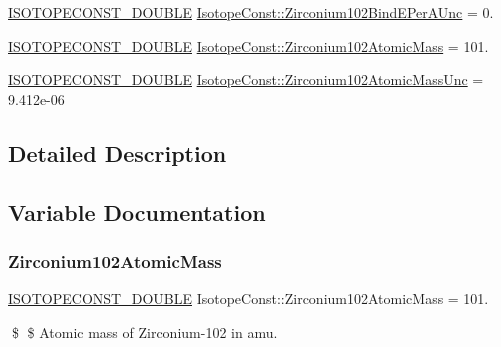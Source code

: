 \begin{DoxyCompactItemize}
\mbox{\hyperlink{group___isotope_const-_macros_ga8f45a7272ce02c0b4c65c44636ed719a}{I\+S\+O\+T\+O\+P\+E\+C\+O\+N\+S\+T\+\_\+\+D\+O\+U\+B\+LE}} \mbox{\hyperlink{group___isotope_const-_zirconium-_zr102_gaeffdb9b4c0a10ebe6998b044232ff07e}{Isotope\+Const\+::\+Zirconium102\+Bind\+E\+Per\+A\+Unc}} = 0.
\item 
\mbox{\hyperlink{group___isotope_const-_macros_ga8f45a7272ce02c0b4c65c44636ed719a}{I\+S\+O\+T\+O\+P\+E\+C\+O\+N\+S\+T\+\_\+\+D\+O\+U\+B\+LE}} \mbox{\hyperlink{group___isotope_const-_zirconium-_zr102_gacc2189c71642520ef259a0fdd64f6caa}{Isotope\+Const\+::\+Zirconium102\+Atomic\+Mass}} = 101.
\item 
\mbox{\hyperlink{group___isotope_const-_macros_ga8f45a7272ce02c0b4c65c44636ed719a}{I\+S\+O\+T\+O\+P\+E\+C\+O\+N\+S\+T\+\_\+\+D\+O\+U\+B\+LE}} \mbox{\hyperlink{group___isotope_const-_zirconium-_zr102_gafd8e0a3168837f3b68dabde20c73aa6e}{Isotope\+Const\+::\+Zirconium102\+Atomic\+Mass\+Unc}} = 9.\+412e-\/06
\end{DoxyCompactItemize}


\subsection{Detailed Description}


\subsection{Variable Documentation}
\mbox{\label{group___isotope_const-_zirconium-_zr102_gacc2189c71642520ef259a0fdd64f6caa}} 
\subsubsection{\texorpdfstring{Zirconium102\+Atomic\+Mass}{Zirconium102AtomicMass}}
{\footnotesize\ttfamily \mbox{\hyperlink{group___isotope_const-_macros_ga8f45a7272ce02c0b4c65c44636ed719a}{I\+S\+O\+T\+O\+P\+E\+C\+O\+N\+S\+T\+\_\+\+D\+O\+U\+B\+LE}} Isotope\+Const\+::\+Zirconium102\+Atomic\+Mass = 101.}

\$ \$ Atomic mass of Zirconium-\/102 in amu. \mbox{\label{group___isotope_const-_zirconium-_zr102_gafd8e0a3168837f3b68dabde20c73aa6e}} 
